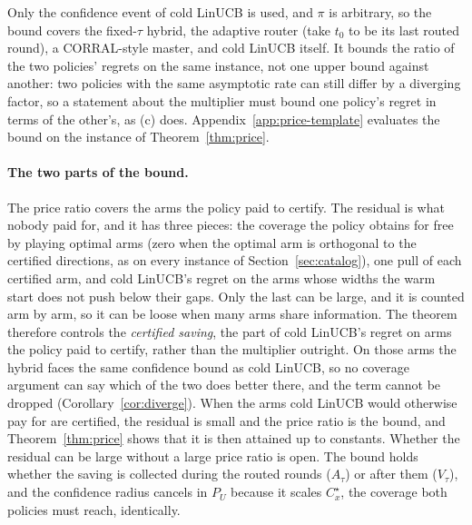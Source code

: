 \documentclass{article}
\theoremstyle{definition}
\theoremstyle{remark}
\theoremstyle{remark}
\begin{document}
Only the confidence event of cold LinUCB is used, and
$\pi$ is arbitrary, so the bound covers the fixed-$\tau$ hybrid, the adaptive
router (take $t_0$ to be its last routed round), a CORRAL-style master, and
cold LinUCB itself. It bounds the ratio of the two policies' regrets on the
same instance, not one upper bound against another: two policies with the
same asymptotic rate can still differ by a diverging factor, so a statement
about the multiplier must bound one policy's regret in terms of the other's,
as (c) does. Appendix~\ref{app:price-template} evaluates the bound on the
instance of Theorem~\ref{thm:price}.

\paragraph{The two parts of the bound.}
The price ratio covers the arms the policy paid to certify. The
residual is what nobody paid for, and it has three pieces: the coverage the policy obtains for free by playing optimal arms
(zero when the optimal arm is orthogonal to the certified directions, as on
every instance of Section~\ref{sec:catalog}), one pull of each certified arm,
and cold LinUCB's regret on the arms whose widths the warm start does not push
below their gaps. Only the last can be large, and it is counted arm by arm,
so it can be loose when many arms share information. The theorem therefore
controls the \emph{certified saving}, the part of cold LinUCB's regret on arms
the policy paid to certify, rather than the multiplier outright. On those arms the hybrid faces
the same confidence bound as cold LinUCB, so no coverage argument can say
which of the two does better there, and the term cannot be dropped
(Corollary~\ref{cor:diverge}). When the arms cold LinUCB would
otherwise pay for are certified, the residual is small and the price ratio is
the bound, and Theorem~\ref{thm:price} shows that it is then attained up to
constants.
Whether the residual can be large without a large price ratio is open. The
bound holds whether the saving is collected during the routed rounds
($A_\tau$) or after them ($V_\tau$), and the confidence radius cancels in
$P_U$ because it scales $C^\star_x$, the coverage both policies must reach,
identically.
\end{document}
